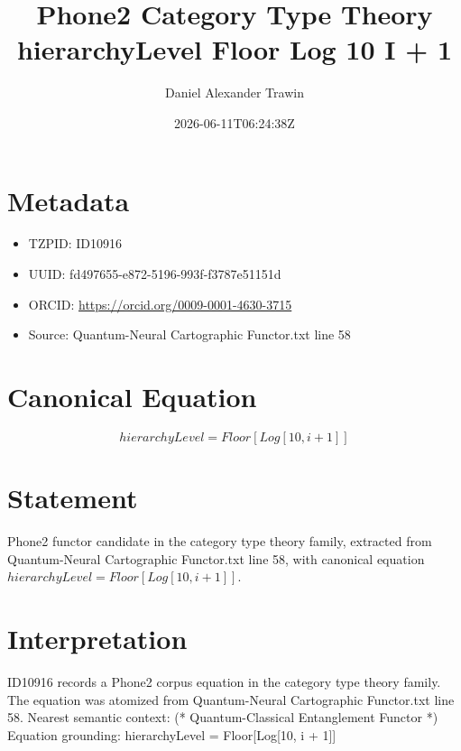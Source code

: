 \documentclass[11pt]{article}
\title{Phone2 Category Type Theory hierarchyLevel Floor Log 10 I + 1}
\author{Daniel Alexander Trawin}
\date{2026-06-11T06:24:38Z}
\begin{document}
\maketitle
\section*{Metadata}
\begin{itemize}
\item TZPID: ID10916
\item UUID: fd497655-e872-5196-993f-f3787e51151d
\item ORCID: \url{https://orcid.org/0009-0001-4630-3715}
\item Source: Quantum-Neural Cartographic Functor.txt line 58
\end{itemize}
\section*{Canonical Equation}
\[
hierarchyLevel = Floor[Log[10, i + 1]]
\]
\section*{Statement}
Phone2 functor candidate in the category type theory family, extracted from Quantum-Neural Cartographic Functor.txt line 58, with canonical equation $hierarchyLevel = Floor[Log[10, i + 1]]$.
\section*{Interpretation}
ID10916 records a Phone2 corpus equation in the category type theory family. The equation was atomized from Quantum-Neural Cartographic Functor.txt line 58. Nearest semantic context: (* Quantum-Classical Entanglement Functor *) Equation grounding: hierarchyLevel = Floor[Log[10, i + 1]]
\end{document}
